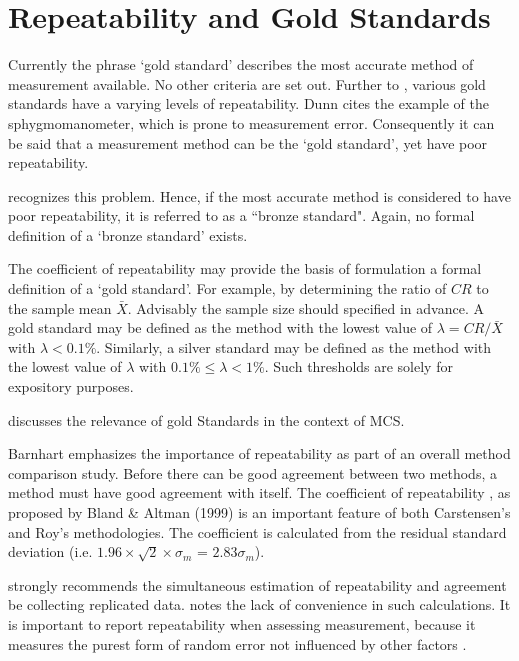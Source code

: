 \documentclass[12pt, a4paper]{report}
\theoremstyle{plain}
\theoremstyle{definition}
\theoremstyle{remark}
\begin{document}
	





		\section{Repeatability and Gold Standards}
		Currently the phrase `gold standard' describes the most accurate method of measurement available. No other criteria are set out. Further to \citet{dunnSEME}, various gold standards have a varying levels of repeatability. Dunn cites the example of the sphygmomanometer, which is prone to measurement error. Consequently it can be said that a measurement method can be the `gold standard', yet have poor repeatability. 
		
		\citet{dunnSEME} recognizes  this problem. Hence, if the most accurate method is considered to have poor repeatability, it is referred to as a ``bronze standard".  Again, no formal definition of a `bronze standard' exists.
		
		The coefficient of repeatability may provide the basis of formulation a formal definition of a `gold standard'. For example, by determining the ratio of $CR$ to the sample mean $\bar{X}$. Advisably the sample size should specified in advance. A gold standard may be defined as the method with the lowest value of $\lambda = CR /\bar{X}$ with $\lambda < 0.1\%$. Similarly, a silver standard may be defined as the method with the lowest value of $\lambda $ with $0.1\% \leq \lambda < 1\%$. Such thresholds are solely for expository purposes.
		

\citet{ARoy2015} discusses the relevance of gold Standards in the context of MCS.


		
	
	Barnhart emphasizes the importance of repeatability as part of an overall method comparison study. Before there can be good agreement between two methods, a method must have good agreement with itself. The coefficient of repeatability , as proposed by Bland \& Altman (1999) is an important feature of both Carstensen's and Roy's methodologies. The coefficient is calculated from the residual standard deviation (i.e. $1.96 \times \sqrt{2} \times \sigma_m$ = $2.83 \sigma_m$).
	
	
	\citet{BA99} strongly recommends the simultaneous estimation of repeatability and agreement be collecting replicated data. \citet{ARoy2009} notes the lack of convenience in such calculations.
	It is important to report repeatability when assessing measurement, because it measures the purest form of random error not influenced by other factors \citep{Barnhart}.	
	
\end{document}
